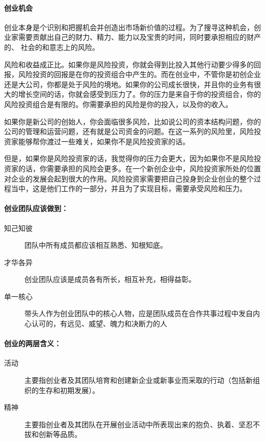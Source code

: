 \documentclass[UTF8]{article}
\begin{document}
\paragraph{创业机会}
创业本身是个识别和把握机会并创造出市场新价值的过程。为了搜寻这种机会，创业家需要贡献出自己的财力、精力、能力以及宝贵的时间，同时要承担相应的财产的、
社会的和意志上的风险。

风险和收益成正比。如果你是风险投资，你就会得到比投入其他行动要少得多的回报，风险投资的回报是在你的投资组合中产生的。而在创业中，不管你是初创企业还是大公司，你都是处于风险的境地。如果你的公司成长很快，并且你的业务有很大的增长空间的话，你就会感受到压力了。你的压力是来自于你的投资组合，你的风险投资组合是有限的。你需要承担的风险是你的投入，以及你的收入。

如果你是新公司的创始人，你会面临很多风险，比如说公司的资本结构问题，你的公司的管理和运营问题，还有就是公司资金的问题。在这一系列的风险里，风险投资家能够帮你渡过一些难关，如果你不是风险投资家的话。

但是，如果你是风险投资家的话，我觉得你的压力会更大，因为如果你不是风险投资家的话，你需要承担的风险会更多。在一个新创企业中，风险投资家所处的位置对企业的发展会起到很大的作用。风险投资家需要把自己投身到企业创业的整个过程当中，这是他们工作的一部分，并且为了实现目标，需要承受风险和压力。

\paragraph{创业团队应该做到：}
\begin{description}
    \item[知己知彼]团队中所有成员都应该相互熟悉、知根知底。
    \item[才华各异]创业团队应该是成员各有所长，相互补充，相得益彰。
    \item[单一核心]带头人作为创业团队中的核心人物，应是团队成员在合作共事过程中发自内心认可的，有远见、威望、魄力和决断力的人
\end{description}
\paragraph{创业的两层含义：}
\begin{description}
\item[活动]主要指创业者及其团队培育和创建新企业或新事业而采取的行动（包括新组织的生存和初期发展）。
\item[精神]主要指创业者及其团队在开展创业活动中所表现出来的抱负、执着、坚忍不拔和创新等品质。
\end{description}
\end{document}
